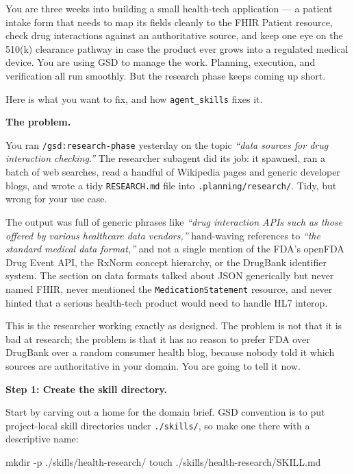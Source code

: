 \documentclass[11pt,letterpaper,openany]{book}
\begin{document}
\begin{gsdscenario}

You are three weeks into building a small health-tech application --- a
patient intake form that needs to map its fields cleanly to the FHIR
Patient resource, check drug interactions against an authoritative
source, and keep one eye on the 510(k) clearance pathway in case the
product ever grows into a regulated medical device. You are using GSD
to manage the work. Planning, execution, and verification all run
smoothly. But the research phase keeps coming up short.

Here is what you want to fix, and how \texttt{agent\_skills} fixes it.

\textbf{\large The problem.}

You ran \texttt{/gsd:research-phase} yesterday on the topic
\textit{``data sources for drug interaction checking.''} The researcher
subagent did its job: it spawned, ran a batch of web searches, read a
handful of Wikipedia pages and generic developer blogs, and wrote a
tidy \texttt{RESEARCH.md} file into \texttt{.planning/research/}.
Tidy, but wrong for your use case.

The output was full of generic phrases like \textit{``drug interaction
APIs such as those offered by various healthcare data vendors,''}
hand-waving references to \textit{``the standard medical data format,''}
and not a single mention of the FDA's openFDA Drug Event API, the RxNorm
concept hierarchy, or the DrugBank identifier system. The section on
data formats talked about JSON generically but never named FHIR, never
mentioned the \texttt{MedicationStatement} resource, and never hinted
that a serious health-tech product would need to handle HL7 interop.

This is the researcher working exactly as designed. The problem is not
that it is bad at research; the problem is that it has no reason to
prefer FDA over DrugBank over a random consumer health blog, because
nobody told it which sources are authoritative in your domain. You are
going to tell it now.

\textbf{\large Step 1: Create the skill directory.}

Start by carving out a home for the domain brief. GSD convention is to
put project-local skill directories under \texttt{./skills/}, so make
one there with a descriptive name:

\begin{gsdbash}
mkdir -p ./skills/health-research/
touch ./skills/health-research/SKILL.md
\end{gsdbash}


\end{gsdscenario}
\end{document}
